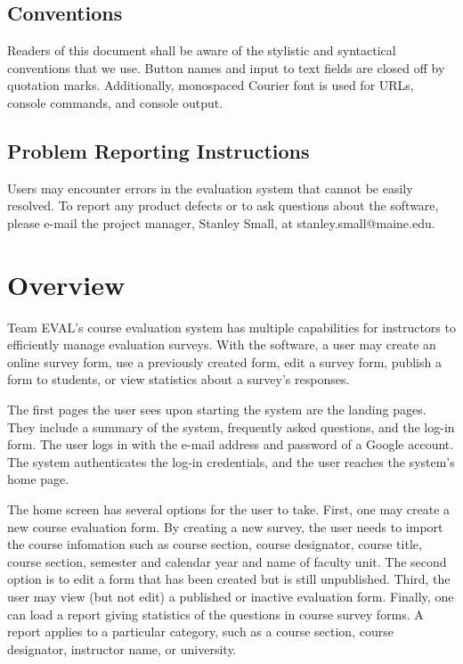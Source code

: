 \documentclass{article}
\begin{document}
\subsection{Conventions}

Readers of this document shall be aware of the stylistic and syntactical conventions that we use. Button names and input to text fields are closed off by quotation marks. Additionally, monospaced Courier font is used for URLs, console commands, and console output.

\subsection{Problem Reporting Instructions}

Users may encounter errors in the evaluation system that cannot be easily resolved. To report any product defects or to ask questions about the software, please e-mail the project manager, Stanley Small, at stanley.small@maine.edu.

\section{Overview}

Team EVAL's course evaluation system has multiple capabilities for instructors to efficiently manage evaluation surveys. With the software, a user may create an online survey form, use a previously created form, edit a survey form, publish a form to students, or view statistics about a survey's responses.

The first pages the user sees upon starting the system are the landing pages. They include a summary of the system, frequently asked questions, and the log-in form. The user logs in with the e-mail address and password of a Google account. The system authenticates the log-in credentials, and the user reaches the system's home page.

The home screen has several options for the user to take. First, one may create a new course evaluation form. By creating a new survey, the user needs to import the course infomation such as course section, course designator, course title, course section, semester and calendar year and name of faculty unit. The second option is to edit a form that has been created but is still unpublished. Third, the user may view (but not edit) a published or inactive evaluation form. Finally, one can load a report giving statistics of the questions in course survey forms. A report applies to a particular category, such as a course section, course designator, instructor name, or university.
\end{document}
